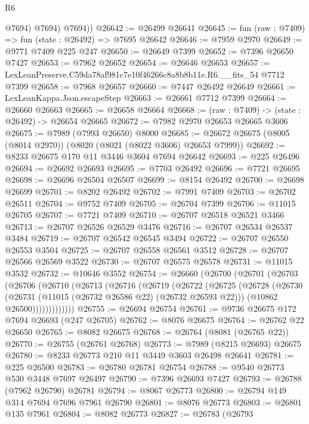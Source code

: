\begin{lexlean}{R6}
\begin{coremodule}
            @7694)
          @7694)
        @7694))
@26642 := @26499 @26641
@26645 := fun (raw : @7409) => fun (state : @26492) => @7695 @26642
@26646 := @7959 @2970
@26649 := @9771 @7409 @225 @247
@26650 := @26649 @7399
@26652 := @7396 @26650 @7427
@26653 := @7962 @26652
@26654 := @26646 @26653
@26657 := LexLeanPreserve.C59da78af981c7e10f46266c8a8b8b11e.R6.__fits_54 @7712 @7399
@26658 := @7968 @26657
@26660 := @7447 @26492 @26649
@26661 := LexLeanKappa.Json.escapeStep
@26663 := @26661 @7712 @7399
@26664 := @26660 @26663
@26665 := @26658 @26664
@26668 := (raw : @7409) -> (state : @26492) -> @26654 @26665
@26672 := @7982 @2970 @26653 @26665 @3606
@26675 := @7989 (@7993 @26650) @8000
@26685 := @26672 @26675 (@8005 (@8014 @2970)) (@8020 (@8021 (@8022 @3606) @26653 @7999))
@26692 := @8233 @26675 @170 @11 @3446 @3604 @7694 @26642
@26693 := @225 @26496
@26694 := @26692 @26693
@26695 := @7703 @26492
@26696 := @7721 @26695
@26698 := @26696 @26504 @26507
@26699 := @8154 @26492
@26700 := @26698 @26699
@26701 := @8202 @26492
@26702 := @7991 @7409
@26703 := @26702 @26511
@26704 := @9752 @7409
@26705 := @26704 @7399
@26706 := @11015 @26705
@26707 := @7721 @7409
@26710 := @26707 @26518 @26521 @3466
@26713 := @26707 @26526 @26529 @3476
@26716 := @26707 @26534 @26537 @3484
@26719 := @26707 @26542 @26545 @3494
@26722 := @26707 @26550 @26553 @3504
@26725 := @26707 @26558 @26561 @3512
@26728 := @26707 @26566 @26569 @3522
@26730 := @26707 @26575 @26578
@26731 := @11015 @3532
@26732 := @10646 @3552
@26754 := @26660
    (@26700
      (@26701
        (@26703
          (@26706
            (@26710
              (@26713
                (@26716
                  (@26719
                    (@26722
                      (@26725
                        (@26728
                          (@26730
                            (@26731 (@11015 (@26732 @26586 @22) (@26732 @26593 @22)))
                            (@10862 @26500)))))))))))))
@26755 := @26694 @26754
@26761 := @9736 @26675 @172 @7694 @26693 (@247 @26705)
@26762 := @8076 @26675
@26764 := @26762 @22 @26650
@26765 := @8082 @26675
@26768 := @26764 (@8081 (@26765 @22))
@26770 := @26755 (@26761 @26768)
@26773 := @7989 (@8215 @26693) @26675
@26780 := @8233 @26773 @210 @11 @3449 @3603 @26498 @26641
@26781 := @225 @26500
@26783 := @26780 @26781 @26754
@26788 := @9540 @26773 @530 @3448 @7697 @26497
@26790 := @7396 @26693 @7427
@26793 := @26788 (@7962 @26790) @26781
@26794 := @8067 @26773
@26800 := @26794 @149 @314 @7694 @7696 @7961 @26790
@26801 := @8076 @26773
@26803 := @26801 @135 @7961
@26804 := @8082 @26773
@26827 := @26783
    (@26793

\end{coremodule}
\end{lexlean}
